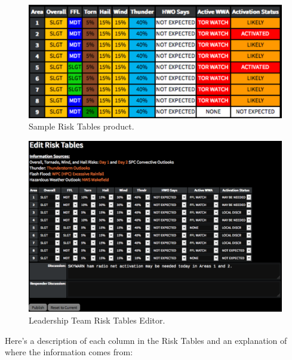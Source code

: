 \documentclass[pdflatex,letterpaper,twoside,12pt]{book}
\begin{document}
\begin{figure}[h]
  \centering
  \includegraphics[width=\textwidth,keepaspectratio=true]{img/ops-risk-tables-sample}
  \caption{Sample Risk Tables product.\label{fig:ops-risk-tables-sample}}
\end{figure}

\begin{figure}[h]
  \centering
  \includegraphics[width=\textwidth,keepaspectratio=true]{img/ops-risk-tables-editor}
  \caption{Leadership Team Risk Tables Editor.\label{fig:ops-risk-tables-editor}}
\end{figure}

Here's a description of each column in the Risk Tables and an explanation of where the information comes from:
\end{document}
